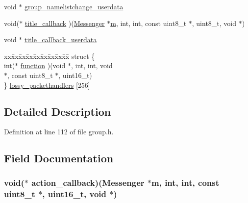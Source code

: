 \begin{DoxyCompactItemize}
\item 
void $\ast$ \hyperlink{struct_group___chats_a4c6b98ab07da7e69ecb7ae245f765984}{group\+\_\+namelistchange\+\_\+userdata}
\item 
void($\ast$ \hyperlink{struct_group___chats_a3a2940882c161941fd7f3274064bd594}{title\+\_\+callback} )(\hyperlink{struct_messenger}{Messenger} $\ast$\hyperlink{struct_group___chats_aea6eb6c7c30a659f1b0dee83eaf03ea2}{m}, int, int, const uint8\+\_\+t $\ast$, uint8\+\_\+t, void $\ast$)
\item 
void $\ast$ \hyperlink{struct_group___chats_a75c386ae84b59f8f38e02cd0f841ba8b}{title\+\_\+callback\+\_\+userdata}
\item 
\begin{tabbing}
xx\=xx\=xx\=xx\=xx\=xx\=xx\=xx\=xx\=\kill
struct \{\\
\>int($\ast$ \hyperlink{struct_group___chats_acbfbbdaa6d4201766377ac50de985ae9}{function} )(void $\ast$, int, int, void \\
\>\>$\ast$, const uint8\_t $\ast$, uint16\_t)\\
\} \hyperlink{struct_group___chats_a3630aa7993bdd216d40637826a92649f}{lossy\_packethandlers} \mbox{[}256\mbox{]}\\

\end{tabbing}\end{DoxyCompactItemize}


\subsection{Detailed Description}


Definition at line 112 of file group.\+h.



\subsection{Field Documentation}
\hypertarget{struct_group___chats_a61996fdab7da709944de726b88872d61}{
\subsubsection[{action\+\_\+callback}]{\setlength{\rightskip}{0pt plus 5cm}void($\ast$ action\+\_\+callback)({\bf Messenger} $\ast${\bf m}, int, int, const uint8\+\_\+t $\ast$, uint16\+\_\+t, void $\ast$)}}\label{struct_group___chats_a61996fdab7da709944de726b88872d61}


